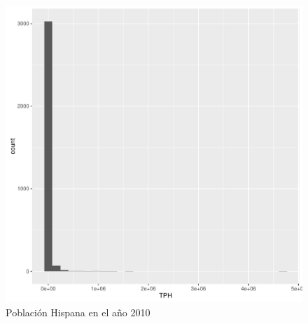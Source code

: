 \begin{figure}[H]
	\centering
\begin{knitrout}
\color{fgcolor}\begin{kframe}
\begin{alltt}
         \hlopt{+} \hlstd{()}
\end{alltt}
\end{kframe}
\includegraphics[width=\maxwidth]{figure/pobHisp2010-1} 

\end{knitrout}
	\caption{Población Hispana en el año 2010}
\end{figure}

